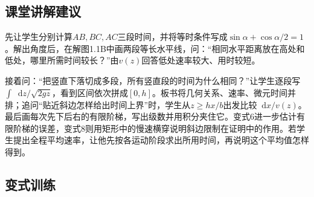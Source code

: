 \documentclass[UTF8,fontset=fandol,a4paper,11pt]{ctexart}
\newcommand{\dd}{\mathop{}\!\mathrm{d}}
\begin{document}


\subsection*{课堂讲解建议}

先让学生分别计算$AB,BC,AC$三段时间，并将等时条件写成$\sin\alpha+\cos\alpha/2=1$。解出角度后，在解图1.1B中画两段等长水平线，问：“相同水平距离放在高处和低处，哪里所需时间较长？”由$v(z)$回答低处速率较大、用时较短。

接着问：“把竖直下落切成多段，所有竖直段的时间为什么相同？”让学生逐段写$\int\dd z/\sqrt{2gz}$，看到区间依次拼成$[0,h]$。板书将几何关系、速率、微元时间并排；追问“贴近斜边怎样给出时间上界”时，学生从$z\ge hx/b$出发比较$\dd x/v(z)$。最后画每次先下后右的有限阶梯，写出级数并用积分夹住它。变式6进一步估计有限阶梯的误差，变式8则用矩形中的慢速横穿说明斜边限制在证明中的作用。若学生提出全程平均速率，让他先按各运动阶段求出所用时间，再说明这个平均值怎样得到。



\subsection*{变式训练}
\end{document}
